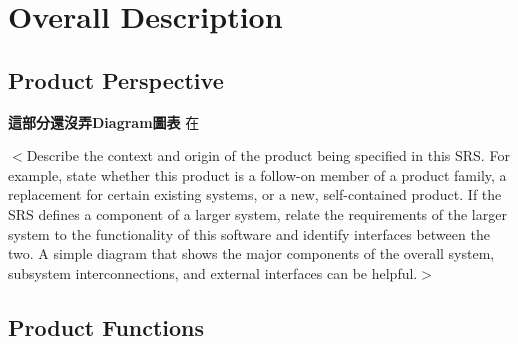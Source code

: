 \documentclass{scrreprt}
\begin{document}
\chapter{Overall Description}

\section{Product Perspective}
\begin{CJK}{UTF8}{<font>}
\textbf {\LARGE 這部分還沒弄Diagram圖表} \newline
在

$<$Describe the context and origin of the product being specified in this SRS.  
For example, state whether this product is a follow-on member of a product 
family, a replacement for certain existing systems, or a new, self-contained 
product. If the SRS defines a component of a larger system, relate the 
requirements of the larger system to the functionality of this software and 
identify interfaces between the two. A simple diagram that shows the major 
components of the overall system, subsystem interconnections, and external 
interfaces can be helpful.$>$
\end{CJK}

\section{Product Functions}
\begin{CJK}{UTF8}{<font>}


\end{CJK}
\end{document}
